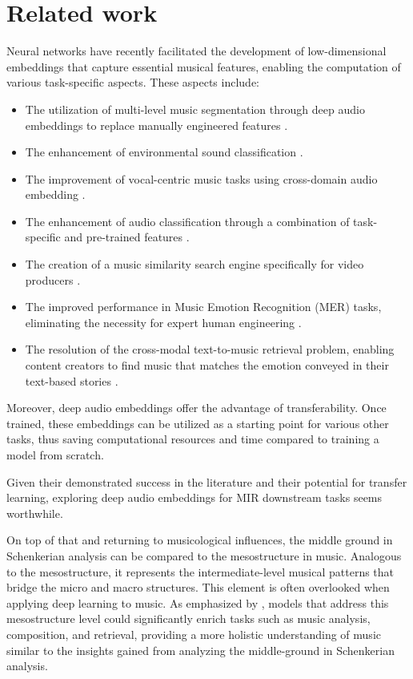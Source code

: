 \section{Related work}

Neural networks have recently facilitated the development of low-dimensional embeddings that capture essential musical features, enabling the computation of various task-specific aspects. These aspects include:

\begin{itemize}

\item The utilization of multi-level music segmentation through deep audio embeddings to replace manually engineered features \cite{SalamonDeepSegmentation}.

\item The enhancement of environmental sound classification \cite{Kim2020OneStrategies}.

\item The improvement of vocal-centric music tasks using cross-domain audio embedding \cite{Kim2021LearningLoss}.

\item The enhancement of audio classification through a combination of task-specific and pre-trained features \cite{Hung2022Feature-informedClassification}.

\item The creation of a music similarity search engine specifically for video producers \cite{epidemic}.

\item The improved performance in Music Emotion Recognition (MER) tasks, eliminating the necessity for expert human engineering \cite{KohComparisonRecognition}.

\item The resolution of the cross-modal text-to-music retrieval problem, enabling content creators to find music that matches the emotion conveyed in their text-based stories \cite{WonEmotionStories}.
\end{itemize}

Moreover, deep audio embeddings offer the advantage of transferability. Once trained, these embeddings can be utilized as a starting point for various other tasks, thus saving computational resources and time compared to training a model from scratch.

Given their demonstrated success in the literature and their potential for transfer learning, exploring deep audio embeddings for MIR downstream tasks seems worthwhile.

On top of that and returning to musicological influences, the middle ground in Schenkerian analysis can be compared to the mesostructure in music. Analogous to the mesostructure, it represents the intermediate-level musical patterns that bridge the micro and macro structures. This element is often overlooked when applying deep learning to music. As emphasized by \cite{Mesostructures2023}, models that address this mesostructure level could significantly enrich tasks such as music analysis, composition, and retrieval, providing a more holistic understanding of music similar to the insights gained from analyzing the middle-ground in Schenkerian analysis. \cite{Introduction_to_Schenkerian_Analysis}
